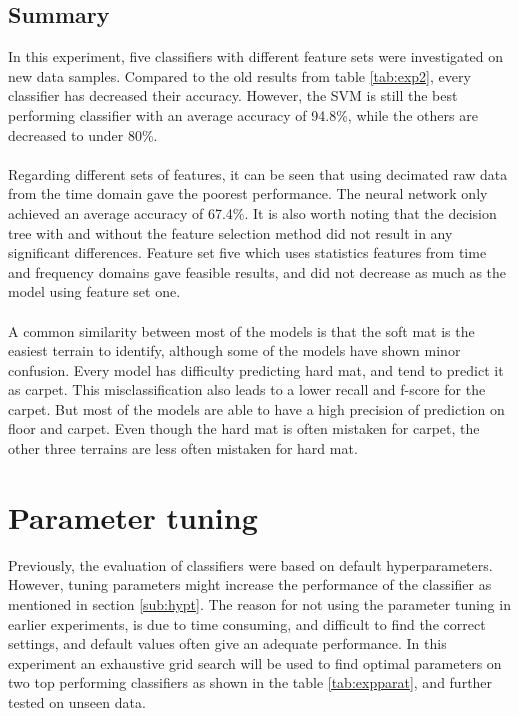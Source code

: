 \documentclass[USenglish]{ifimaster}  %
\begin{document}
\FloatBarrier
\newpage

\subsection{Summary}
In this experiment, five classifiers with different feature sets were investigated on new data samples. Compared to the old results from table \ref{tab:exp2}, every classifier has decreased their accuracy. However, the SVM is still the best performing classifier with an average accuracy of 94.8\%, while the others are decreased to under 80\%. 
\\
\\
Regarding different sets of features, it can be seen that using decimated raw data from the time domain gave the poorest performance. The neural network only achieved an average accuracy of 67.4\%. It is also worth noting that the decision tree with and without the feature selection method did not result in any significant differences. Feature set five which uses statistics features from time and frequency domains gave feasible results, and did not decrease as much as the model using feature set one.
\\
\\
A common similarity between most of the models is that the soft mat is the easiest terrain to identify, although some of the models have shown minor confusion. Every model has difficulty predicting hard mat, and tend to predict it as carpet. This misclassification also leads to a lower recall and f-score for the carpet. But most of the models are able to have a high precision of prediction on floor and carpet. Even though the hard mat is often mistaken for carpet, the other three terrains are less often mistaken for hard mat.


\newpage
\section{Parameter tuning}
Previously, the evaluation of classifiers were based on default hyperparameters. However, tuning parameters might increase the performance of the classifier as mentioned in section \ref{sub:hypt}. The reason for not using the parameter tuning in earlier experiments, is due to time consuming, and difficult to find the correct settings, and default values often give an adequate performance. In this experiment an exhaustive grid search will be used to find optimal parameters on two top performing classifiers as shown in the table \ref{tab:expparat}, and further tested on unseen data.
\end{document}
